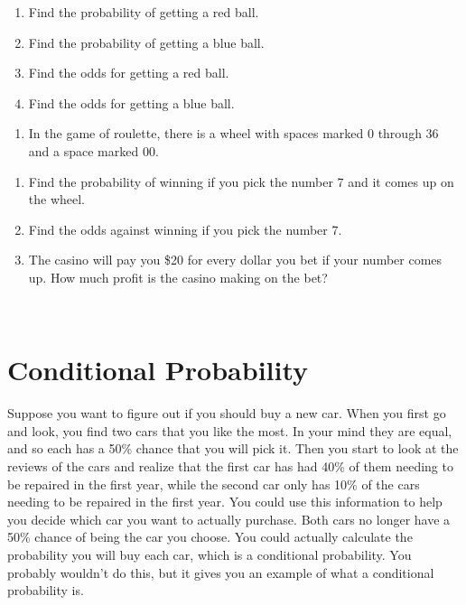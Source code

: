 \documentclass[
]{book}
\providecommand{\tightlist}{%
  \setlength{\itemsep}{0pt}\setlength{\parskip}{0pt}}
\begin{document}
\begin{enumerate}
\def\labelenumi{\alph{enumi}.}
\tightlist
\item
  Find the probability of getting a red ball.
\item
  Find the probability of getting a blue ball.
\item
  Find the odds for getting a red ball.
\item
  Find the odds for getting a blue ball.
\end{enumerate}

\begin{enumerate}
\def\labelenumi{\arabic{enumi}.}
\setcounter{enumi}{7}
\tightlist
\item
  In the game of roulette, there is a wheel with spaces marked 0 through 36 and a space marked 00.
\end{enumerate}

\begin{enumerate}
\def\labelenumi{\alph{enumi}.}
\tightlist
\item
  Find the probability of winning if you pick the number 7 and it comes up on the wheel.
\item
  Find the odds against winning if you pick the number 7.
\item
  The casino will pay you \$20 for every dollar you bet if your number comes up. How much profit is the casino making on the bet?
\end{enumerate}

\textbf{\\
}

\hypertarget{conditional-probability}{%
\section{Conditional Probability}\label{conditional-probability}}

Suppose you want to figure out if you should buy a new car. When you first go and look, you find two cars that you like the most. In your mind they are equal, and so each has a 50\% chance that you will pick it. Then you start to look at the reviews of the cars and realize that the first car has had 40\% of them needing to be repaired in the first year, while the second car only has 10\% of the cars needing to be repaired in the first year. You could use this information to help you decide which car you want to actually purchase. Both cars no longer have a 50\% chance of being the car you choose. You could actually calculate the probability you will buy each car, which is a conditional probability. You probably wouldn't do this, but it gives you an example of what a conditional probability is.
\end{document}
